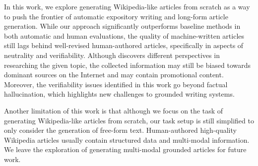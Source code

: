 In this work, we explore generating Wikipedia-like articles from scratch as a way to push the frontier of automatic expository writing and long-form article generation. While our approach significantly outperforms baseline methods in both automatic and human evaluations, the quality of machine-written articles still lags behind well-revised human-authored articles, specifically in aspects of neutrality and verifiability. Although \system discovers different perspectives in researching the given topic, the collected information may still be biased towards dominant sources on the Internet and may contain promotional content. Moreover, the verifiability issues identified in this work go beyond factual hallucination, which highlights new challenges to grounded writing systems.

Another limitation of this work is that although we focus on the task of generating Wikipedia-like articles from scratch, our task setup is still simplified to only consider the generation of free-form text. Human-authored high-quality Wikipedia articles usually contain structured data and multi-modal information. We leave the exploration of generating multi-modal grounded articles for future work.
